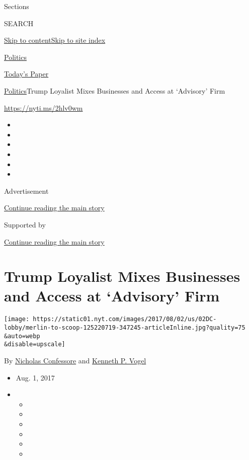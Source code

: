 Sections

SEARCH

\protect\hyperlink{site-content}{Skip to
content}\protect\hyperlink{site-index}{Skip to site index}

\href{https://www.nytimes.com/section/politics}{Politics}

\href{https://myaccount.nytimes.com/auth/login?response_type=cookie\&client_id=vi}{}

\href{https://www.nytimes.com/section/todayspaper}{Today's Paper}

\href{/section/politics}{Politics}\textbar{}Trump Loyalist Mixes
Businesses and Access at `Advisory' Firm

\url{https://nyti.ms/2hlv0wm}

\begin{itemize}
\item
\item
\item
\item
\item
\item
\end{itemize}

Advertisement

\protect\hyperlink{after-top}{Continue reading the main story}

Supported by

\protect\hyperlink{after-sponsor}{Continue reading the main story}

\hypertarget{trump-loyalist-mixes-businesses-and-access-at-advisory-firm}{%
\section{Trump Loyalist Mixes Businesses and Access at `Advisory'
Firm}\label{trump-loyalist-mixes-businesses-and-access-at-advisory-firm}}

\texttt{[image: https://static01.nyt.com/images/2017/08/02/us/02DC-lobby/merlin-to-scoop-125220719-347245-articleInline.jpg?quality=75\\\&auto=webp\\\&disable=upscale]}

By \href{http://www.nytimes.com/by/nicholas-confessore}{Nicholas
Confessore} and
\href{https://www.nytimes.com/by/kenneth-p-vogel}{Kenneth P. Vogel}

\begin{itemize}
\item
  Aug. 1, 2017
\item
  \begin{itemize}
  \item
  \item
  \item
  \item
  \item
  \item
  \end{itemize}
\end{itemize}

